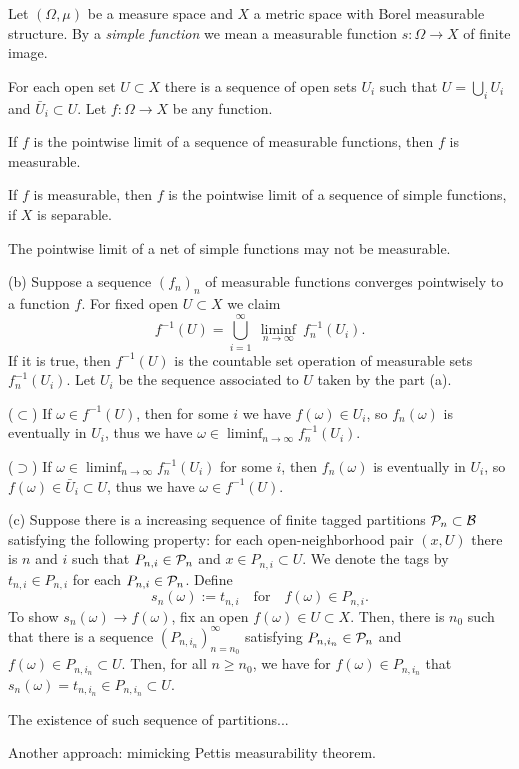 \documentclass{../../large}
\begin{document}
\begin{prb}
Let $(\Omega,\mu)$ be a measure space and $X$ a metric space with Borel measurable structure.
By a \emph{simple function} we mean a measurable function $s:\Omega\to X$ of finite image.
\begin{parts}
\item For each open set $U\subset X$ there is a sequence of open sets $U_i$ such that $U=\bigcup_iU_i$ and $\bar U_i\subset U$.
Let $f:\Omega\to X$ be any function.
\item If $f$ is the pointwise limit of a sequence of measurable functions, then $f$ is measurable.
\item If $f$ is measurable, then $f$ is the pointwise limit of a sequence of simple functions, if $X$ is separable.
\item* The pointwise limit of a net of simple functions may not be measurable.
\end{parts}
\end{prb}
\begin{pf}

(b)
Suppose a sequence $(f_n)_n$ of measurable functions converges pointwisely to a function $f$.
For fixed open $U\subset X$ we claim
\[f^{-1}(U)=\bigcup_{i=1}^\infty\ \liminf_{n\to\infty}\ f_n^{-1}(U_i).\]
If it is true, then $f^{-1}(U)$ is the countable set operation of measurable sets $f_n^{-1}(U_i)$.
Let $U_i$ be the sequence associated to $U$ taken by the part (a).

($\subset$) If $\omega\in f^{-1}(U)$, then for some $i$ we have $f(\omega)\in U_i$, so $f_n(\omega)$ is eventually in $U_i$, thus we have $\omega\in\liminf_{n\to\infty}f_n^{-1}(U_i)$.

($\supset$) If $\omega\in\liminf_{n\to\infty}f_n^{-1}(U_i)$ for some $i$, then $f_n(\omega)$ is eventually in $U_i$, so $f(\omega)\in\bar U_i\subset U$, thus we have $\omega\in f^{-1}(U)$.

(c)
Suppose there is a increasing sequence of finite tagged partitions $\mathcal{P}_n\subset\mathcal{B}$ satisfying the following property: for each open-neighborhood pair $(x,U)$ there is $n$ and $i$ such that $P_{n,i}\in\mathcal{P}_n$ and $x\in P_{n,i}\subset U$.
We denote the tags by $t_{n,i}\in P_{n,i}$ for each $P_{n,i}\in\mathcal{P}_n$.
Define
\[s_n(\omega):=t_{n,i}\quad\text{for}\quad f(\omega)\in P_{n,i}.\]
To show $s_n(\omega)\to f(\omega)$, fix an open $f(\omega)\in U\subset X$.
Then, there is $n_0$ such that there is a sequence $(P_{n,i_n})_{n=n_0}^\infty$ satisfying $P_{n,i_n}\in\mathcal{P}_n$ and $f(\omega)\in P_{n,i_n}\subset U$.
Then, for all $n\ge n_0$, we have for $f(\omega)\in P_{n,i_n}$ that $s_n(\omega)=t_{n,i_n}\in P_{n,i_n}\subset U$.

The existence of such sequence of partitions...

Another approach: mimicking Pettis measurability theorem.
\end{pf}
\end{document}
